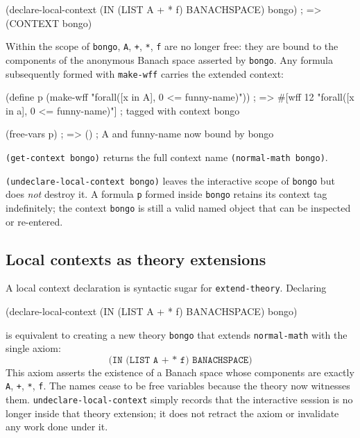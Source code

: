 \documentclass{amsbook}[openany]
\theoremstyle{definition}
\theoremstyle{remark}
\theoremstyle{remark}
\begin{document}
\begin{VNBsnip}
(declare-local-context (IN (LIST A + * f) BANACHSPACE) bongo)
; => (CONTEXT bongo)
\end{VNBsnip}

Within the scope of \texttt{bongo}, \texttt{A}, \texttt{+}, \texttt{*},
\texttt{f} are no longer free: they are bound to the components of the
anonymous Banach space asserted by \texttt{bongo}.  Any formula
subsequently formed with \texttt{make-wff} carries the extended context:

\begin{VNBsnip}
(define p (make-wff "forall([x in A], 0 <= funny-name)"))
; => #[wff 12 "forall([x in a], 0 <= funny-name)"]   ; tagged with context bongo

(free-vars p)
; => ()    ; A and funny-name now bound by bongo
\end{VNBsnip}

\texttt{(get-context bongo)} returns the full context name
\texttt{(normal-math bongo)}.

\texttt{(undeclare-local-context bongo)} leaves the interactive scope of
\texttt{bongo} but does \emph{not} destroy it.  A formula \texttt{p}
formed inside \texttt{bongo} retains its context tag indefinitely;
the context \texttt{bongo} is still a valid named object that can be
inspected or re-entered.

\subsection{Local contexts as theory extensions}

A local context declaration is syntactic sugar for
\texttt{extend-theory}.  Declaring

\begin{VNBsnip}
(declare-local-context (IN (LIST A + * f) BANACHSPACE) bongo)
\end{VNBsnip}

is equivalent to creating a new theory \texttt{bongo} that extends
\texttt{normal-math} with the single axiom:
\[
  \texttt{(IN (LIST A + * f) BANACHSPACE)}
\]
This axiom asserts the existence of a Banach space whose components are
exactly \texttt{A}, \texttt{+}, \texttt{*}, \texttt{f}.  The names
cease to be free variables because the theory now witnesses them.
\texttt{undeclare-local-context} simply records that the interactive
session is no longer inside that theory extension; it does not retract
the axiom or invalidate any work done under it.
\end{document}
